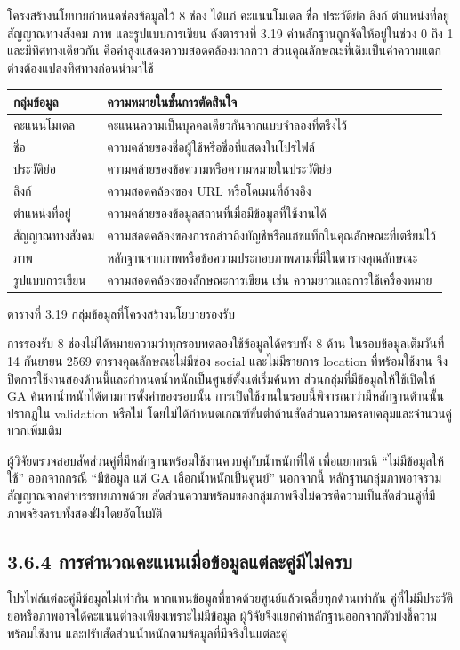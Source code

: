 โครงสร้างนโยบายกำหนดช่องข้อมูลไว้ 8 ช่อง ได้แก่ คะแนนโมเดล ชื่อ ประวัติย่อ ลิงก์ ตำแหน่งที่อยู่ สัญญาณทางสังคม ภาพ และรูปแบบการเขียน ดังตารางที่ 3.19 ค่าหลักฐานถูกจัดให้อยู่ในช่วง 0 ถึง 1 และมีทิศทางเดียวกัน คือค่าสูงแสดงความสอดคล้องมากกว่า ส่วนคุณลักษณะที่เดิมเป็นค่าความแตกต่างต้องแปลงทิศทางก่อนนำมาใช้

\begin{center}\small
\begin{tabularx}{\linewidth}{p{2.5cm}X}
\toprule
กลุ่มข้อมูล & ความหมายในชั้นการตัดสินใจ \\
\midrule
คะแนนโมเดล & คะแนนความเป็นบุคคลเดียวกันจากแบบจำลองที่ตรึงไว้ \\
ชื่อ & ความคล้ายของชื่อผู้ใช้หรือชื่อที่แสดงในโปรไฟล์ \\
ประวัติย่อ & ความคล้ายของข้อความหรือความหมายในประวัติย่อ \\
ลิงก์ & ความสอดคล้องของ URL หรือโดเมนที่อ้างอิง \\
ตำแหน่งที่อยู่ & ความคล้ายของข้อมูลสถานที่เมื่อมีข้อมูลที่ใช้งานได้ \\
สัญญาณทางสังคม & ความสอดคล้องของการกล่าวถึงบัญชีหรือแฮชแท็กในคุณลักษณะที่เตรียมไว้ \\
ภาพ & หลักฐานจากภาพหรือข้อความประกอบภาพตามที่มีในตารางคุณลักษณะ \\
รูปแบบการเขียน & ความสอดคล้องของลักษณะการเขียน เช่น ความยาวและการใช้เครื่องหมาย \\
\bottomrule
\end{tabularx}
\par ตารางที่ 3.19 กลุ่มข้อมูลที่โครงสร้างนโยบายรองรับ
\end{center}

การรองรับ 8 ช่องไม่ได้หมายความว่าทุกรอบทดลองใช้ข้อมูลได้ครบทั้ง 8 ด้าน ในรอบข้อมูลเต็มวันที่ 14 กันยายน 2569 ตารางคุณลักษณะไม่มีช่อง social และไม่มีรายการ location ที่พร้อมใช้งาน จึงปิดการใช้งานสองด้านนี้และกำหนดน้ำหนักเป็นศูนย์ตั้งแต่เริ่มค้นหา ส่วนกลุ่มที่มีข้อมูลให้ใช้เปิดให้ GA ค้นหาน้ำหนักได้ตามการตั้งค่าของรอบนั้น การเปิดใช้งานในรอบนี้พิจารณาว่ามีหลักฐานด้านนั้นปรากฏใน validation หรือไม่ โดยไม่ได้กำหนดเกณฑ์ขั้นต่ำด้านสัดส่วนความครอบคลุมและจำนวนคู่บวกเพิ่มเติม

ผู้วิจัยตรวจสอบสัดส่วนคู่ที่มีหลักฐานพร้อมใช้งานควบคู่กับน้ำหนักที่ได้ เพื่อแยกกรณี ``ไม่มีข้อมูลให้ใช้'' ออกจากกรณี ``มีข้อมูล แต่ GA เลือกน้ำหนักเป็นศูนย์'' นอกจากนี้ หลักฐานกลุ่มภาพอาจรวมสัญญาณจากคำบรรยายภาพด้วย สัดส่วนความพร้อมของกลุ่มภาพจึงไม่ควรตีความเป็นสัดส่วนคู่ที่มีภาพจริงครบทั้งสองฝั่งโดยอัตโนมัติ

\subsection*{3.6.4 การคำนวณคะแนนเมื่อข้อมูลแต่ละคู่มีไม่ครบ}
โปรไฟล์แต่ละคู่มีข้อมูลไม่เท่ากัน หากแทนข้อมูลที่ขาดด้วยศูนย์แล้วเฉลี่ยทุกด้านเท่ากัน คู่ที่ไม่มีประวัติย่อหรือภาพอาจได้คะแนนต่ำลงเพียงเพราะไม่มีข้อมูล ผู้วิจัยจึงแยกค่าหลักฐานออกจากตัวบ่งชี้ความพร้อมใช้งาน และปรับสัดส่วนน้ำหนักตามข้อมูลที่มีจริงในแต่ละคู่

